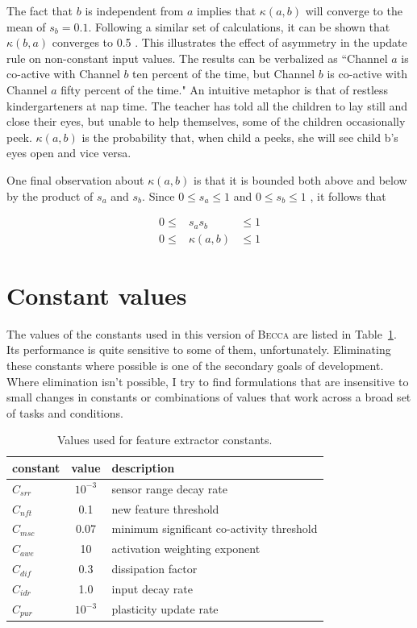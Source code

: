 The fact that $b$ is independent from $a$ implies that $\kappa(a, b)$ will converge to the mean of $s_b=0.1$. Following a similar set of calculations, it can be shown that $\kappa(b, a)$ converges to 0.5 . This illustrates the effect of asymmetry in the update rule on non-constant input values. The results can be verbalized as ``Channel $a$ is co-active with Channel $b$ ten percent of the time, but Channel $b$ is co-active with Channel $a$ fifty percent of the time." An intuitive metaphor is that of restless kindergarteners at nap time. The teacher has told all the children to lay still and close their eyes, but unable to help themselves, some of the children occasionally peek. $\kappa(a, b)$ is the probability that, when child a peeks, she will see child b's eyes open and vice versa.

One final observation about $\kappa(a, b)$ is that it is bounded both above and below by the product of $s_a$ and $s_b$. Since $0 \leq s_a \leq 1$ and $0 \leq s_b \leq 1$ ,  it follows that 

\begin{eqnarray}
0 \leq&s_a s_b&  \leq 1 \\
0 \leq&\kappa(a, b)&  \leq 1 
\end{eqnarray}


\section{Constant values}

The values of the constants used in this version of \textsc{Becca} are listed in Table~\ref{perceiver_constants}. Its performance is quite sensitive to some of them, unfortunately. Eliminating these constants where possible is one of the secondary goals of development. Where elimination isn't possible, I try to find formulations that are insensitive to small changes in constants or combinations of values that work across a broad set of tasks and conditions.

\begin{table}[htdp]
\caption{Values used for feature extractor constants.}
\begin{center}
\begin{tabular}{|l|c|l|}
\hline
constant & value & description\\
\hline
$C_{srr}$ & $10^{-3}$ & sensor range decay rate \\
$C_{nft}$ & 0.1 & new feature threshold \\
$C_{msc}$ & 0.07 & minimum significant co-activity threshold \\
$C_{awe}$ & 10 & activation weighting exponent \\
$C_{dif}$ & 0.3 & dissipation factor \\
$C_{idr}$ & 1.0 & input decay rate \\
$C_{pur}$ & $10^{-3}$ & plasticity update rate \\
\hline
\end{tabular}
\end{center}
\label{perceiver_constants}
\end{table}%

